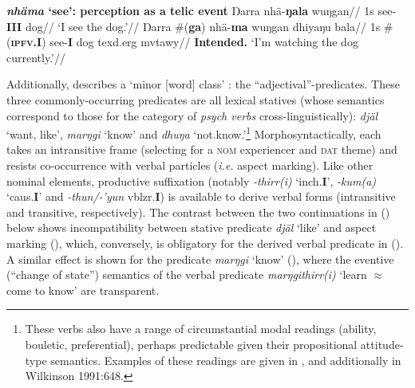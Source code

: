 \documentclass[11pt,dvipsnames]{report}
\begin{document}
\pex\textbf{\textit{nhäma} `see': perception as a telic event}
\a\begingl\gla Ŋarra nhä-\textbf{ŋala} wuŋgan//
\glb 1s see-\textbf{III} dog//
\glft`I see the dog.'\trailingcitation{[BM~20190405]}//\endgl
\a\begingl\gla Ŋarra \#(\textbf{ga}) nhä-\textbf{ma} wuŋgan dhiyaŋu bala//
\glb 1s \#(\textsc{\textbf{ipfv.I}}) see-\textbf{I} dog \gls{texd}.\gls{erg} \gls{mvtawy}//
\glft\textbf{Intended. }`I'm watching the dog currently.'\trailingcitation{[BM~20190405]}//\endgl\xe


%
%

Additionally, \citet[557]{Wilkinson1991} describes a `minor [word] class' : the ``adjectival''-predicates. These three commonly-occurring predicates are all lexical statives (whose semantics correspond to those for the category of \textit{psych verbs} cross-linguistically): \textit{djäl} `want, like', \textit{marŋgi} `know' and \textit{dhuŋa} `not.know.'\footnote{These verbs also have a range of circumstantial modal readings (ability, bouletic, preferential), perhaps predictable given their propositional attitude-type semantics. Examples of these readings are given in , and additionally in Wilkinson 1991:648.} Morphosyntactically, each takes an intransitive frame (selecting for a \textsc{nom} experiencer and \textsc{dat} theme) and resists co-occurrence with verbal particles (\textit{i.e.} aspect marking). Like other nominal elements, productive suffixation (notably \textit{-thirr(i)} `\gls{inch}.\textbf{I}', \textit{-kum(a)} `\gls{caus}.\textbf{I}' and \textit{-thun/-'yun} \gls{vblzr}.\textbf{I}) is available to derive verbal forms (intransitive and transitive, respectively). The contrast between the two continuations in () below shows incompatibility between stative predicate \textit{djäl} `like' and aspect marking (), which, conversely, is obligatory for the derived verbal predicate in (). A similar effect is shown for the predicate \textit{marŋgi} `know' (), where the eventive (``change of state'') semantics of the verbal predicate \textit{marŋgithirr(i)} `learn $ \approx $ come to know' are transparent.
\end{document}
